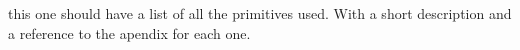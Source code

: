 this one should have a list of all the primitives used. With a short description and a reference to the apendix for each one.
